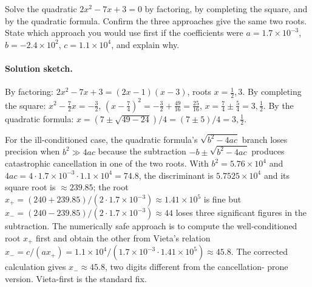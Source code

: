 \begin{exercise}
Solve the quadratic $2x^{2} - 7x + 3 = 0$ by factoring, by
completing the square, and by the quadratic formula. Confirm the
three approaches give the same two roots. State which approach you
would use first if the coefficients were $a = 1.7 \times 10^{-3}$,
$b = -2.4 \times 10^{2}$, $c = 1.1 \times 10^{4}$, and explain why.

\paragraph{Solution sketch.}
By factoring: $2 x^{2} - 7 x + 3 = (2x - 1)(x - 3)$, roots $x =
\tfrac{1}{2}, 3$. By completing the square: $x^{2} - \tfrac{7}{2} x
= -\tfrac{3}{2}$, $(x - \tfrac{7}{4})^{2} = -\tfrac{3}{2} +
\tfrac{49}{16} = \tfrac{25}{16}$, $x = \tfrac{7}{4} \pm \tfrac{5}{4}
= 3, \tfrac{1}{2}$. By the quadratic formula: $x = (7 \pm \sqrt{49 -
24})/4 = (7 \pm 5)/4 = 3, \tfrac{1}{2}$.

For the ill-conditioned case, the quadratic formula's
$\sqrt{b^{2} - 4ac}$ branch loses precision when $b^{2} \gg 4ac$
because the subtraction $-b \pm \sqrt{b^{2} - 4ac}$ produces
catastrophic cancellation in one of the two roots. With $b^{2} =
5.76 \times 10^{4}$ and $4ac = 4 \cdot 1.7 \times 10^{-3} \cdot 1.1
\times 10^{4} = 74.8$, the discriminant is $5.7525 \times 10^{4}$
and its square root is $\approx 239.85$; the root $x_{+} = (240 +
239.85)/(2 \cdot 1.7 \times 10^{-3}) \approx 1.41 \times 10^{5}$ is
fine but $x_{-} = (240 - 239.85)/(2 \cdot 1.7 \times 10^{-3})
\approx 44$ loses three significant figures in the subtraction. The
numerically safe approach is to compute the well-conditioned root
$x_{+}$ first and obtain the other from Vieta's relation $x_{-} =
c/(a x_{+}) = 1.1 \times 10^{4} / (1.7 \times 10^{-3} \cdot 1.41
\times 10^{5}) \approx 45.8$. The corrected calculation gives
$x_{-} \approx 45.8$, two digits different from the cancellation-
prone version. Vieta-first is the standard fix.
\end{exercise}

